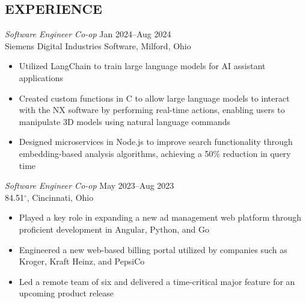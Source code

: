 \documentclass[margin]{res} %
\begin{document}
\begin{resume}
\vspace*{-5.0mm}
 
 
\section{EXPERIENCE}
{\sl Software Engineer Co-op} \hfill {\color{black} Jan 2024–Aug 2024} \\
Siemens Digital Industries Software, Milford, Ohio
\vspace{1mm}
\begin{itemize}  %
\item Utilized LangChain to train large language models for AI assistant applications 
\item Created custom functions in C to allow large language models to interact with the NX software by performing real-time actions, enabling users to manipulate 3D models using natural language commands 
\item Designed microservices in Node.js to improve search functionality through\\embedding-based analysis algorithms, achieving a 50\% reduction in query time 
\end{itemize}


{\sl Software Engineer Co-op} \hfill {\color{black} May 2023–Aug 2023}  \\
84.51$^{\circ}$, Cincinnati, Ohio 
\vspace{1mm}
\begin{itemize}  %
\item Played a key role in expanding a new ad management web platform through proficient development in Angular, Python, and Go
\item Engineered a new web-based billing portal utilized by companies such as Kroger, Kraft Heinz, and PepsiCo
\item Led a remote team of six and delivered a time-critical major feature for an upcoming product release
\end{itemize}



\end{resume}
\end{document}

